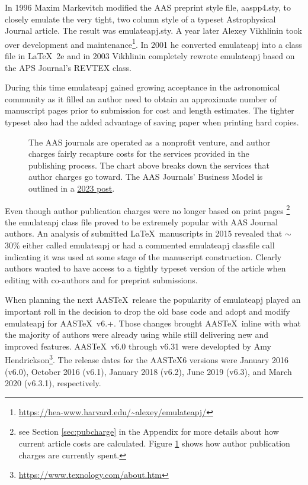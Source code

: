 \documentclass[linenumbers,amsmath,trackchanges]{aastex702}
\newcommand\aastex{AAS\TeX}
\newcommand\latex{La\TeX}
\begin{document}
In 1996 Maxim Markevitch modified the AAS preprint style file, aaspp4.sty,
to closely emulate the very tight, two column style of a typeset
Astrophysical Journal article.  The result was emulateapj.sty. A year
later Alexey Vikhlinin took over development and maintenance\footnote{\url{https://hea-www.harvard.edu/~alexey/emulateapj/}}. In 2001 he
converted emulateapj into a class file in \latex\ 2e and in 2003 Vikhlinin
completely rewrote emulateapj based on the APS Journal's REVTEX class.

During this time emulateapj gained growing acceptance in the astronomical
community as it filled an author need to obtain an approximate number of
manuscript pages prior to submission for cost and length estimates. The
tighter typeset also had the added advantage of saving paper when printing 
hard copies.

\begin{figure}[ht!]
\caption{The AAS journals are operated as a nonprofit venture, and author charges fairly recapture costs for the services provided in the publishing process. The chart above breaks down the services that author charges go toward. The AAS Journals' Business Model is outlined in a \href{https://aas.org/posts/news/2023/08/aas-open-access-publishing-model-open-transparent-and-fair}{2023 post}.
\label{fig:general}}
\end{figure}

Even though author publication charges were no longer based on print pages
\footnote{see Section \ref{sec:pubcharge} in the Appendix for more details
about how current article costs are calculated. Figure \ref{fig:general} shows
how author publication charges are currently spent.} the emulateapj class file
proved to be extremely popular with AAS Journal authors.  An 
analysis of submitted \latex\ manuscripts in 2015 revealed that $\sim$30\%
either called emulateapj or had a commented emulateapj classfile call
indicating it was used at some stage of the manuscript construction.
Clearly authors wanted to have access to a tightly typeset version of the
article when editing with co-authors and for preprint submissions.

When planning the next \aastex\ release the popularity of emulateapj played
an important roll in the decision to drop the old base code and adopt and
modify emulateapj for \aastex\ v6.+.  Those changes brought \aastex\
inline with what the majority of authors were already using while still
delivering new and improved features.  \aastex\ v6.0 through v6.31 were
developted by Amy Hendrickson\footnote{\url{https://www.texnology.com/about.htm}}.
The release dates for the \aastex 6 versions were January 2016 (v6.0),
October 2016 (v6.1), January 2018 (v6.2), June 2019 (v6.3), and March 2020
(v6.3.1), respectively.
\end{document}

